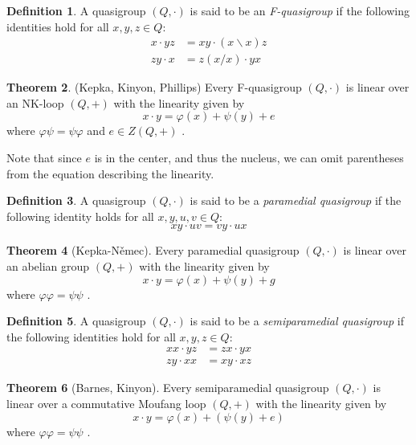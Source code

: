 \documentclass[12pt, twoside, openright]{report}
\theoremstyle{definition}
\newtheorem{thm}{Theorem}[chapter]
\newtheorem{dfn}[thm]{Definition}
\newcommand{\ldv}{\backslash}       %
\newcommand{\rdv}{/}                %
\begin{document}
\begin{dfn}
  A quasigroup $(Q, \cdot)$ is said to be an \emph{F-quasigroup} if the following identities hold
    for all $x, y, z \in Q$:
  \begin{align*}
    x\cdot yz &= xy\cdot (x\ldv x)z\\
    zy\cdot x &= z(x\rdv x) \cdot yx
  \end{align*}
\end{dfn}

\begin{thm}(Kepka, Kinyon, Phillips)
  Every F-quasigroup $(Q, \cdot)$ is linear over an NK-loop $(Q, +)$ with the linearity given by
  \[x\cdot y = \varphi(x) + \psi(y) + e\]
  where $\varphi\psi = \psi\varphi$ and $e\in Z(Q, +)$ \cite{KepkaKinyonPhillips}.
\end{thm}

Note that since $e$ is in the center, and thus the nucleus, we can omit parentheses from the equation
  describing the linearity.

\begin{dfn}
  A quasigroup $(Q, \cdot)$ is said to be a \emph{paramedial quasigroup} if the following identity holds
    for all $x, y, u, v\in Q$:
  \[xy\cdot uv = vy\cdot ux\]
\end{dfn}

\begin{thm}[Kepka-N\v{e}mec]
  Every paramedial quasigroup $(Q, \cdot)$ is linear over an abelian group $(Q, +)$ with the linearity
    given by
  \[x\cdot y = \varphi(x) + \psi(y) + g\]
  where $\varphi\varphi = \psi\psi$ \cite{SP}.
\end{thm}

\begin{dfn}
  A quasigroup $(Q, \cdot)$ is said to be a \emph{semiparamedial quasigroup} if the following identities
    hold for all $x, y, z\in Q$:
  \begin{align*}
    xx\cdot yz &= zx\cdot yx\\
    zy\cdot xx &= xy\cdot xz
  \end{align*}
\end{dfn}

\begin{thm}[Barnes, Kinyon]
  Every semiparamedial quasigroup $(Q, \cdot)$ is linear over a commutative Moufang loop $(Q, +)$ with
    the linearity given by
  \[x\cdot y = \varphi(x) + (\psi(y) + e)\]
  where $\varphi\varphi = \psi\psi$ \cite{BK-isotopes}.
\end{thm}
\end{document}
